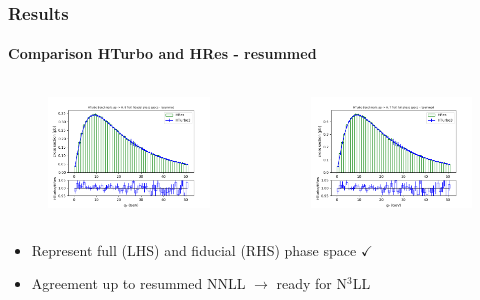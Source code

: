 \documentclass[aspectratio=43]{beamer}
\begin{document}
\begin{frame}
	
	\frametitle{Results}
	\framesubtitle{Comparison HTurbo and HRes - resummed}
	
	\begin{columns}
	
		
		\begin{figure}
			\includegraphics[width = 7cm]{plots/part3/hturbo_figure_6.png}
		\end{figure}
		
		
		\begin{figure}
			\includegraphics[width = 7cm]{plots/part3/hturbo_figure_7.png}
		\end{figure}
	
	\end{columns}

	\begin{itemize}
		\item Represent full (LHS) and fiducial (RHS) phase space {\color{darkgreen}$\checkmark$} 
		\item Agreement up to resummed NNLL $\longrightarrow$ {\color{blue}ready for N$^{3}$LL}
	\end{itemize}

\end{frame}
\end{document}
